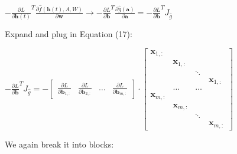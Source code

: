 \documentclass{article}
\begin{document}
\begin{center}
$-\frac{\partial L}{\partial \mathbf{h}(t)}^{T}  \frac{\partial \widehat{f}(\mathbf{h}(t), A, W)}{\partial \mathbf{w}} \rightarrow 
-\frac{\partial L}{\partial \mathbf{b}}^{T} \frac{\partial \widehat{g}(\mathbf{a})}{\partial \mathbf{a}} = -\frac{\partial L}{\partial \mathbf{b}}^{T}  J_{\widehat{g}}$
\end{center}
Expand and plug in Equation (17):
\begin{center}
    $ -\frac{\partial L}{\partial \mathbf{b}}^{T} J_{\widehat{g}} = 
    -\begin{bmatrix}
        \frac{\partial L}{\partial \mathbf{b}_{1,:}} & \frac{\partial L}{\partial \mathbf{b}_{2,:}} & \hdots & \frac{\partial L}{\partial \mathbf{b}_{m,:}}
    \end{bmatrix} \cdot
    \begin{bmatrix}
     \mathbf{x}_{1,:}  & &   &  \\
      & \mathbf{x}_{1,:} & &  \\
     &  & \ddots &\\
     &  &  & \mathbf{x}_{1,:}\\
     & \hdots& \hdots &\\
     \mathbf{x}_{m,:}  & &   &  \\
      & \mathbf{x}_{m,:} & &  \\
     &  & \ddots &\\
     &  &  & \mathbf{x}_{m,:}
\end{bmatrix}$
\end{center}
We again break it into blocks:
\end{document}
